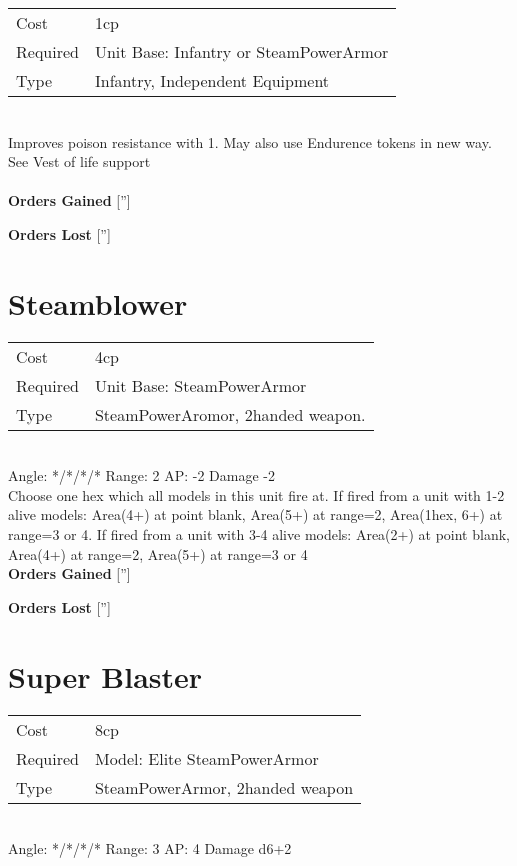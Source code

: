\begin{tabular}{ll}
    Cost & 1cp \\
    Required & Unit Base: Infantry or SteamPowerArmor\\
    Type & Infantry, Independent Equipment\\
\end{tabular}
\ \\
Improves poison resistance with 1. May also use Endurence tokens in new way. See Vest of life support \\

\ \\

{\bf Orders Gained}
['']

{\bf Orders Lost}
['']
\section{ Steamblower }

\begin{tabular}{ll}
    Cost & 4cp \\
    Required & Unit Base: SteamPowerArmor\\
    Type & SteamPowerAromor, 2handed weapon.\\
\end{tabular}
\ \\
\indent Angle: */*/*/* Range: 2  AP: -2 Damage -2 \\
Choose one hex which all models in this unit fire at. If fired from a unit with 1-2 alive models: Area(4+) at point blank, Area(5+) at range=2, Area(1hex, 6+) at range=3 or 4. If fired from a unit with 3-4 alive models: Area(2+) at point blank, Area(4+) at range=2, Area(5+) at range=3 or 4
\ \\

{\bf Orders Gained}
['']

{\bf Orders Lost}
['']
\section{ Super Blaster }

\begin{tabular}{ll}
    Cost & 8cp \\
    Required & Model: Elite SteamPowerArmor\\
    Type & SteamPowerArmor, 2handed weapon\\
\end{tabular}
\ \\
\indent Angle: */*/*/* Range: 3  AP: 4 Damage d6+2 \\

